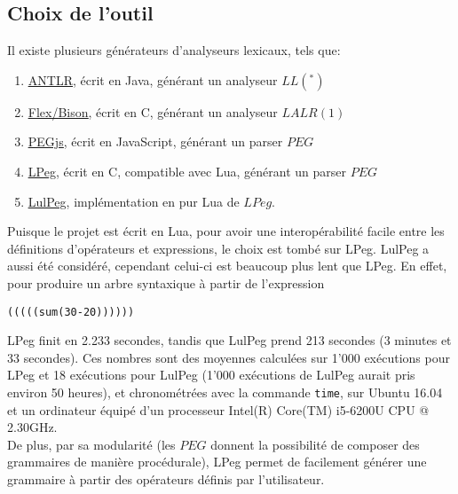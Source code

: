 \documentclass{article}
\begin{document}
\subsection{Choix de l'outil}
Il existe plusieurs générateurs d'analyseurs lexicaux, tels que: 
\begin{enumerate}
	\item \underline{\href{http://www.antlr.org/about.html}{ANTLR}}, écrit en Java, générant un analyseur $LL(^*)$
	\item \underline{\href{http://dinosaur.compilertools.net/}{Flex/Bison}}, écrit en C, générant un analyseur $LALR(1)$
	\item \underline{\href{https://pegjs.org/}{PEGjs}}, écrit en JavaScript, générant un parser $PEG$
	\item \underline{\href{https://github.com/LuaDist/lpeg}{LPeg}}, écrit en C, compatible avec Lua, générant un parser $PEG$
	\item \underline{\href{https://github.com/pygy/LuLPeg}{LulPeg}}, implémentation en pur Lua de $LPeg$.
\end{enumerate}
Puisque le projet est écrit en Lua, pour avoir une interopérabilité facile entre les définitions d'opérateurs et expressions, le choix est tombé sur LPeg. LulPeg a aussi été considéré, cependant celui-ci est beaucoup plus lent que LPeg. En effet, pour produire un arbre syntaxique à partir de l'expression 
\begin{verbatim}
(((((sum(30-20))))))
\end{verbatim}
LPeg finit en 2.233 secondes, tandis que LulPeg prend 213 secondes (3 minutes et 33 secondes). Ces nombres sont des moyennes calculées sur 1'000 exécutions pour LPeg et 18 exécutions pour LulPeg (1'000 exécutions de LulPeg aurait pris environ 50 heures), et chronométrées avec la commande \lstinline|time|, sur Ubuntu 16.04 et un ordinateur équipé d'un processeur Intel(R) Core(TM) i5-6200U CPU @ 2.30GHz. \\
De plus, par sa modularité (les $PEG$ donnent la possibilité de composer des grammaires de manière procédurale), LPeg permet de facilement générer une grammaire à partir des opérateurs définis par l'utilisateur.
\end{document}
